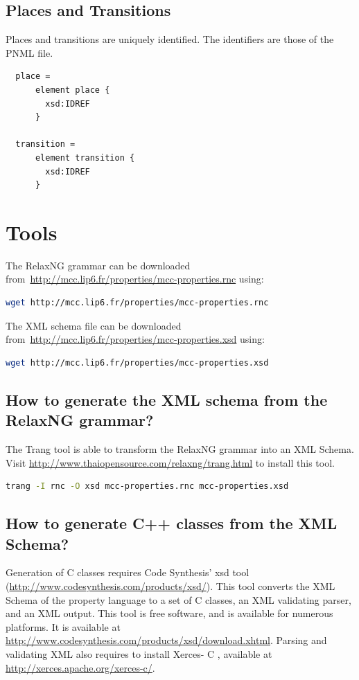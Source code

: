 \documentclass[10pt,english,a4paper]{article}
\newcommand{\CC}{%
  C\nolinebreak\hspace{-.05em}\raisebox{.4ex}{\scriptsize\bf +}\nolinebreak\hspace{-.10em}\raisebox{.4ex}{\scriptsize\bf +}%
}
\begin{document}
\subsection{Places and Transitions}

Places and transitions are uniquely identified. The identifiers are those of the PNML file.

\begin{lstlisting}
  place =
      element place {
        xsd:IDREF
      }

  transition =
      element transition {
        xsd:IDREF
      }
\end{lstlisting}

\clearpage
\section{Tools}
The RelaxNG grammar can be downloaded from~\url{http://mcc.lip6.fr/properties/mcc-properties.rnc} using:
\begin{lstlisting}[language=sh]
  wget http://mcc.lip6.fr/properties/mcc-properties.rnc
\end{lstlisting}

The XML schema file can be downloaded from~\url{http://mcc.lip6.fr/properties/mcc-properties.xsd} using:
\begin{lstlisting}[language=sh]
  wget http://mcc.lip6.fr/properties/mcc-properties.xsd
\end{lstlisting}

\subsection{How to generate the XML schema from the RelaxNG grammar?}
The Trang tool is able to transform the RelaxNG grammar into an XML Schema.
Visit \url{http://www.thaiopensource.com/relaxng/trang.html} to install this tool.

\begin{lstlisting}[language=sh]
  trang -I rnc -O xsd mcc-properties.rnc mcc-properties.xsd
\end{lstlisting}

\subsection{How to generate C++ classes from the XML Schema?}
Generation of {\CC} classes requires Code Synthesis' xsd tool
(\url{http://www.codesynthesis.com/products/xsd/}).
This tool converts the XML Schema of the property language to a set of \CC{} classes,
an XML validating parser, and an XML output.
This tool is free software, and is available for numerous platforms.
It is available at \url{http://www.codesynthesis.com/products/xsd/download.xhtml}.
Parsing and validating XML also requires to install Xerces-\CC{},
available at \url{http://xerces.apache.org/xerces-c/}.
\end{document}
